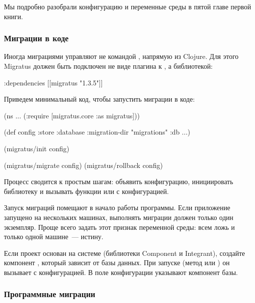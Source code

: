 Мы подробно разобрали конфигурацию и переменные среды в пятой главе первой книги.

\subsubsection{Миграции в коде}

Иногда миграциями управляют не командой , напрямую из Clojure. Для этого Migratus должен быть подключен не виде плагина к , а библиотекой:

\begin{english}
  \begin{clojure}
{:dependencies [[migratus "1.3.5"]]}
  \end{clojure}
\end{english}

Приведем минимальный код, чтобы запустить миграции в коде:

\begin{english}
  \begin{clojure}
(ns ...
  (:require
   [migratus.core :as migratus]))

(def config
  {:store :database
   :migration-dir "migrations"
   :db {...}})

(migratus/init config)

(migratus/migrate config)
(migratus/rollback config)
  \end{clojure}
\end{english}

Процесс сводится к простым шагам: объявить конфигурацию, инициировать библиотеку и вызывать функции  или  с конфигурацией.

Запуск миграций помещают в начало работы программы. Если приложение запущено на нескольких машинах, выполнять миграции должен только один экземпляр. Проще всего задать этот признак переменной среды: всем ложь и только одной машине~--- истину.

Если проект основан на системе (библиотеки Component и Integrant), создайте компонент , который зависит от базы данных. При запуске (метод  или ) он вызывает  с конфигурацией. В поле  конфигурации указывают компонент базы.

\subsubsection{Программные миграции}

